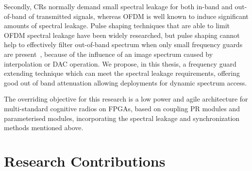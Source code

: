 Secondly, CRs normally demand small spectral leakage for both in-band and out-of-band of transmitted signals, whereas OFDM is well known to induce significant amounts of spectral leakage.
Pulse shaping techniques that are able to limit OFDM spectral leakage have been widely researched, but pulse shaping cannot help to effectively filter out-of-band spectrum when only small frequency guards are present~\cite{PhamMay2014}, because of the influence of an image spectrum caused by interpolation or DAC operation.
We propose, in this thesis, a frequency guard extending technique which can meet the spectral leakage requirements, offering good out of band attenuation allowing deployments for dynamic spectrum access.

The overriding objective for this research is a low power and agile architecture for multi-standard cognitive radios on FPGAs, based on coupling PR modules and parameterised modules, incorporating the spectral leakage and synchronization methods mentioned above.

\section{Research Contributions}

